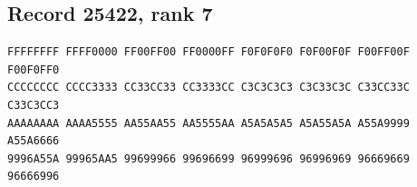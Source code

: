 \documentclass[11pt]{amsart}
\theoremstyle{definition}
\theoremstyle{remark}
\numberwithin{equation}{section}
\numberwithin{table}{section}
\begin{document}
\subsection*{Record 25422, rank 7}
\begin{Verbatim}[fontsize=\scriptsize,xleftmargin=1em]
FFFFFFFF FFFF0000 FF00FF00 FF0000FF F0F0F0F0 F0F00F0F F00FF00F F00F0FF0
CCCCCCCC CCCC3333 CC33CC33 CC3333CC C3C3C3C3 C3C33C3C C33CC33C C33C3CC3
AAAAAAAA AAAA5555 AA55AA55 AA5555AA A5A5A5A5 A5A55A5A A55A9999 A55A6666
9996A55A 99965AA5 99699966 99696699 96999696 96996969 96669669 96666996
\end{Verbatim}
\par
{}\par
\end{document}
